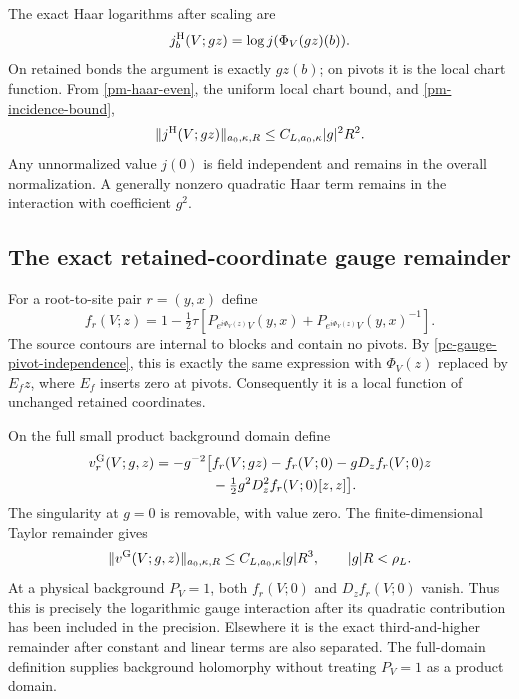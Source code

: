 The exact Haar logarithms after scaling are
\begin{equation}\label{pm-haar-log}
 j_b^{\rm H}(V;gz)=\log j(\Phi_V(gz)(b)).
\end{equation}
On retained bonds the argument is exactly $gz(b)$; on pivots
it is the local chart function. From
\eqref{pm-haar-even}, the uniform local chart bound, and
\eqref{pm-incidence-bound},
\begin{equation}\label{pm-haar-bound}
 \|j^{\rm H}(V;gz)\|_{a_0,\kappa,R}
 \le C_{L,a_0,\kappa}|g|^2R^2.
\end{equation}
Any unnormalized value $j(0)$ is field independent and remains
in the overall normalization. A generally nonzero quadratic
Haar term remains in the interaction with coefficient $g^2$.

\subsection{The exact retained-coordinate gauge remainder}
\label{pm-gauge-section}

For a root-to-site pair $r=(y,x)$ define
\begin{equation}\label{pm-gauge-primitive}
 f_r(V;z)=1-\tfrac12\tau\left[
 P_{e^{i\Phi_V(z)}V}(y,x)
 +P_{e^{i\Phi_V(z)}V}(y,x)^{-1}\right].
\end{equation}
The source contours are internal to blocks and contain no
pivots. By \eqref{pc-gauge-pivot-independence}, this is
exactly the same expression with $\Phi_V(z)$ replaced by
$E_fz$, where $E_f$ inserts zero at pivots. Consequently
it is a local function of unchanged retained coordinates.

On the full small product background domain define
\begin{equation}\label{pm-gauge-remainder}
 \begin{split}
 v_r^{\rm G}(V;g,z)=-g^{-2}\bigl[
 &f_r(V;gz)-f_r(V;0)-gD_zf_r(V;0)z\\
 &-\tfrac12g^2D_z^2f_r(V;0)[z,z]\bigr].
 \end{split}
\end{equation}
The singularity at $g=0$ is removable, with value zero.
The finite-dimensional Taylor remainder gives
\begin{equation}\label{pm-gauge-bound}
 \|v^{\rm G}(V;g,z)\|_{a_0,\kappa,R}
 \le C_{L,a_0,\kappa}|g|R^3,
 \qquad |g|R<\rho_L.
\end{equation}
At a physical background $P_V=1$, both $f_r(V;0)$ and
$D_zf_r(V;0)$ vanish. Thus this is precisely the logarithmic
gauge interaction after its quadratic contribution has been
included in the precision. Elsewhere it is the exact
third-and-higher remainder after constant and linear terms
are also separated. The full-domain definition supplies
background holomorphy without treating $P_V=1$ as a product
domain.

